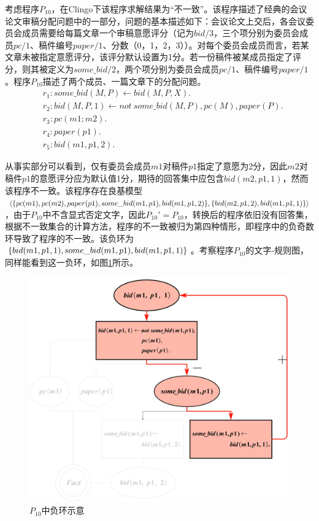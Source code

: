 \begin{example}
    考虑程序$P_{10}$，在Clingo下该程序求解结果为“不一致”。该程序描述了经典的会议论文审稿分配问题中的一部分，问题的基本描述如下：会议论文上交后，各会议委员会成员需要给每篇文章一个审稿意愿评分（记为$bid/3$，三个项分别为委员会成员$pc/1$、稿件编号$paper/1$、分数（0，1，2，3））。对每个委员会成员而言，若某文章未被指定意愿评分，该评分默认设置为1分。若一份稿件被某成员指定了评分，则其被定义为$some\_bid/2$，两个项分别为委员会成员$pc/1$、稿件编号$paper/1$。程序$P_{10}$描述了两个成员、一篇文章下的分配问题。
    \begin{align*}
        \label{prg:p10}
        &r_1: some\_bid(M, P) \leftarrow bid(M, P, X). \\
        &r_2: bid(M, P, 1) \leftarrow not\ some\_bid(M, P), pc(M), paper(P).\\
        &r_3: pc(m1;m2).\\
        &r_4: paper(p1).\\
        &r_5: bid(m1,p1,2).
    \end{align*}
    
    从事实部分可以看到，仅有委员会成员$m1$对稿件$p1$指定了意愿为2分，因此$m2$对稿件$p1$的意愿评分应为默认值1分，期待的回答集中应包含$bid(m2, p1, 1)$，然而该程序不一致。该程序存在良基模型$\langle \{pc(m1), pc(m2), paper(p1), some\_bid(m1,p1), bid(m1, p1,\\2)\},\{bid(m2,p1,2), bid(m1, p1, 1)\}\rangle$，由于$P_{10}$中不含显式否定文字，因此$P_{10}'=P_{10}$，转换后的程序依旧没有回答集，根据不一致集合的计算方法，程序的不一致被归为第四种情形，即程序中的负奇数环导致了程序的不一致。该负环为$\{bid(m1, p1, 1), some\_bid(m1,\\ p1), bid(m1, p1, 1)\}$。考察程序$P_{10}$的文字-规则图，同样能看到这一负环，如图\ref{fig:negcyclep10}所示。
    \begin{figure}[!h]
    \centering
    \includegraphics[height=.6\textwidth, valign=c]{figures/pc-incst例子.jpg}
    \caption{$P_{10}$中负环示意}
    \label{fig:negcyclep10}
\end{figure}
    

\end{example}
